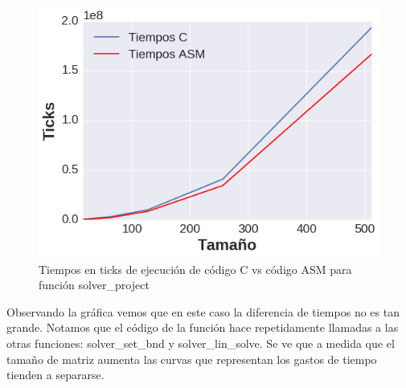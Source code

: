 \begin{figure}[h]
\centering
\includegraphics[scale=0.6] {solver_project}
   \caption{Tiempos en ticks de ejecución de código C vs código ASM para función solver\_project}
\end{figure}

\par Observando la gráfica vemos que en este caso la diferencia de tiempos no es tan grande. Notamos que el código de la función hace repetidamente llamadas a las otras funciones: solver\_set\_bnd y solver\_lin\_solve. Se ve que a medida que el tamaño de matriz aumenta las curvas que representan los gastos de tiempo tienden a separarse.




